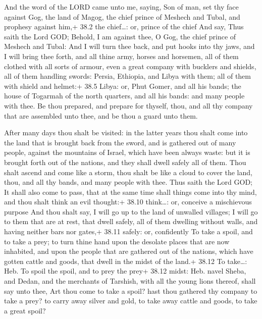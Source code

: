  And the word of the LORD came unto me, saying, 
Son of man, set thy face against Gog, the land of Magog, the chief
prince of Meshech and Tubal, and prophesy against him,+ 38.2 the
chief\ldots: or, prince of the chief  And say, Thus saith
the Lord GOD; Behold, I am against thee, O Gog, the chief prince of
Meshech and Tubal:  And I will turn thee back, and put hooks
into thy jaws, and I will bring thee forth, and all thine army, horses
and horsemen, all of them clothed with all sorts of armour, even a great
company with bucklers and shields, all of them handling swords:
 Persia, Ethiopia, and Libya with them; all of them with
shield and helmet:+ 38.5 Libya: or, Phut  Gomer, and all his
bands; the house of Togarmah of the north quarters, and all his bands:
and many people with thee.  Be thou prepared, and prepare
for thyself, thou, and all thy company that are assembled unto thee, and
be thou a guard unto them.

 After many days thou shalt be visited: in the latter
years thou shalt come into the land that is brought back from the sword,
and is gathered out of many people, against the mountains of Israel,
which have been always waste: but it is brought forth out of the
nations, and they shall dwell safely all of them.  Thou
shalt ascend and come like a storm, thou shalt be like a cloud to cover
the land, thou, and all thy bands, and many people with thee.
 Thus saith the Lord GOD; It shall also come to pass, that
at the same time shall things come into thy mind, and thou shalt think
an evil thought:+ 38.10 think\ldots: or, conceive a mischievous purpose
 And thou shalt say, I will go up to the land of unwalled
villages; I will go to them that are at rest, that dwell safely, all of
them dwelling without walls, and having neither bars nor gates,+ 38.11
safely: or, confidently  To take a spoil, and to take a
prey; to turn thine hand upon the desolate places that are now
inhabited, and upon the people that are gathered out of the nations,
which have gotten cattle and goods, that dwell in the midst of the
land.+ 38.12 To take\ldots: Heb. To spoil the spoil, and to prey the
prey+ 38.12 midst: Heb. navel  Sheba, and Dedan, and the
merchants of Tarshish, with all the young lions thereof, shall say unto
thee, Art thou come to take a spoil? hast thou gathered thy company to
take a prey? to carry away silver and gold, to take away cattle and
goods, to take a great spoil?

